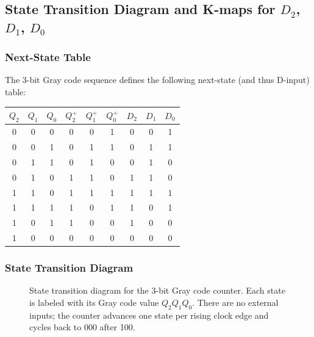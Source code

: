 \documentclass[12pt, letterpaper]{article}
\begin{document}
\subsection{State Transition Diagram and K-maps for $D_2$, $D_1$, $D_0$}

\subsubsection*{Next-State Table}

The 3-bit Gray code sequence defines the following next-state (and thus D-input) table:

\begin{center}
\begin{tabular}{|ccc|ccc|ccc|}
  \hline
  $Q_2$ & $Q_1$ & $Q_0$ & $Q_2^+$ & $Q_1^+$ & $Q_0^+$ & $D_2$ & $D_1$ & $D_0$ \\
  \hline
  0 & 0 & 0 & 0 & 0 & 1 & 0 & 0 & 1 \\
  0 & 0 & 1 & 0 & 1 & 1 & 0 & 1 & 1 \\
  0 & 1 & 1 & 0 & 1 & 0 & 0 & 1 & 0 \\
  0 & 1 & 0 & 1 & 1 & 0 & 1 & 1 & 0 \\
  1 & 1 & 0 & 1 & 1 & 1 & 1 & 1 & 1 \\
  1 & 1 & 1 & 1 & 0 & 1 & 1 & 0 & 1 \\
  1 & 0 & 1 & 1 & 0 & 0 & 1 & 0 & 0 \\
  1 & 0 & 0 & 0 & 0 & 0 & 0 & 0 & 0 \\
  \hline
\end{tabular}
\end{center}

\subsubsection*{State Transition Diagram}

\begin{figure}[H]
\centering
{}
\caption{State transition diagram for the 3-bit Gray code counter. Each state is labeled
with its Gray code value $Q_2Q_1Q_0$. There are no external inputs; the counter advances
one state per rising clock edge and cycles back to 000 after 100.}
\end{figure}
\end{document}

